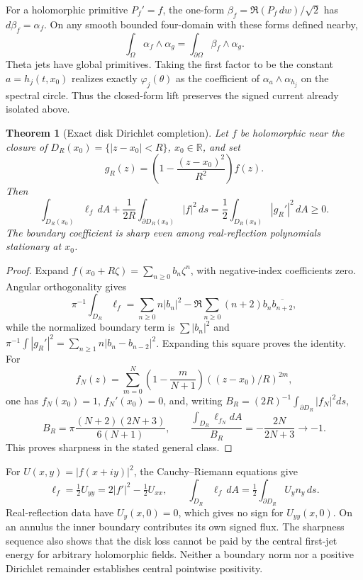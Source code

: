 \documentclass[11pt]{article}
\numberwithin{equation}{section}
\newtheorem{theorem}{Theorem}[section]
\theoremstyle{definition}
\theoremstyle{remark}
\newcommand{\R}{\mathbb R}
\newcommand{\dd}{\,d}
\begin{document}
For a holomorphic primitive \(P_f'=f\), the one-form
\(\beta_f=\Re(P_f\,dw)/\sqrt2\) has \(d\beta_f=\alpha_f\).
On any smooth bounded four-domain with these forms defined nearby,
\[
 \int_\Omega\alpha_f\wedge\alpha_g
                =\int_{\partial\Omega}\beta_f\wedge\alpha_g .
\]
Theta jets have global primitives.  Taking the first factor to be the
constant \(a=h_j(t,x_0)\) realizes exactly
\(\varphi_j(\theta)\) as the coefficient of
\(\alpha_a\wedge\alpha_{h_j}\) on the spectral circle.  Thus the
closed-form lift preserves the signed current already isolated above.

\begin{theorem}[Exact disk Dirichlet completion]
\label{sf:disk}
Let \(f\) be holomorphic near the closure of
\(D_R(x_0)=\{|z-x_0|<R\}\), \(x_0\in\R\), and set
\[
 g_R(z)=\left(1-\frac{(z-x_0)^2}{R^2}\right)f(z).
\]
Then
\begin{equation}
 \int_{D_R(x_0)}\ell_f\dd A+
       \frac1{2R}\int_{\partial D_R(x_0)}|f|^2\dd s
       =\frac12\int_{D_R(x_0)}|g_R'|^2\dd A\ge0.
 \label{sf:disk-completion}
\end{equation}
The boundary coefficient is sharp even among real-reflection
polynomials stationary at \(x_0\).
\end{theorem}
\begin{proof}
Expand \(f(x_0+R\zeta)=\sum_{n\ge0}b_n\zeta^n\), with negative-index
coefficients zero.  Angular orthogonality gives
\[
 \pi^{-1}\int_{D_R}\ell_f=
 \sum_{n\ge0}n|b_n|^2
       -\Re\sum_{n\ge0}(n+2)b_n\overline{b_{n+2}},
\]
while the normalized boundary term is \(\sum|b_n|^2\) and
\(\pi^{-1}\int|g_R'|^2=\sum_{n\ge1}n|b_n-b_{n-2}|^2\).
Expanding this square proves the identity.  For
\[
 f_N(z)=\sum_{m=0}^N\left(1-\frac m{N+1}\right)
                         ((z-x_0)/R)^{2m},
\]
one has \(f_N(x_0)=1\), \(f_N'(x_0)=0\), and, writing
\(B_R=(2R)^{-1}\int_{\partial D_R}|f_N|^2ds\),
\[
 B_R=\pi\frac{(N+2)(2N+3)}{6(N+1)},\qquad
 \frac{\int_{D_R}\ell_{f_N}dA}{B_R}
                         =-\frac{2N}{2N+3}\longrightarrow-1 .
\]
This proves sharpness in the stated general class.
\end{proof}

For \(U(x,y)=|f(x+iy)|^2\), the Cauchy--Riemann equations give
\begin{equation}
 \ell_f=\tfrac12U_{yy}=2|f'|^2-\tfrac12U_{xx},\qquad
 \int_{D_R}\ell_f\dd A=\tfrac12\int_{\partial D_R}U_y n_y\dd s .
 \label{sf:normal-density}
\end{equation}
Real-reflection data have \(U_y(x,0)=0\), which gives no sign for
\(U_{yy}(x,0)\).  On an annulus the inner boundary contributes its
own signed flux.  The sharpness sequence also shows that the disk
loss cannot be paid by the central first-jet energy for arbitrary
holomorphic fields.  Neither a boundary norm nor a positive
Dirichlet remainder establishes central pointwise positivity.
\end{document}
